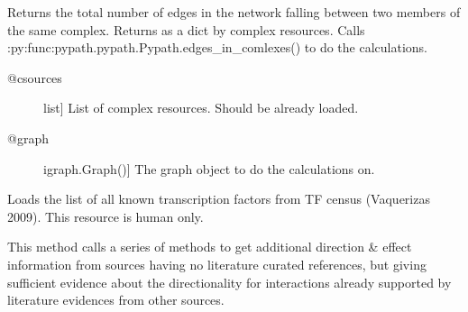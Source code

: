 \documentclass[letterpaper,10pt,english]{sphinxmanual}
\begin{document}
\begin{fulllineitems}

\begin{fulllineitems}
\label{\detokenize{main:pypath.main.PyPath.sum_in_complex}}
Returns the total number of edges in the network falling
between two members of the same complex.
Returns as a dict by complex resources.
Calls :py:func:pypath.pypath.Pypath.edges\_in\_comlexes()
to do the calculations.
\begin{description}
\item[{@csources}] \leavevmode{[}list{]}
List of complex resources. Should be already loaded.

\item[{@graph}] \leavevmode{[}igraph.Graph(){]}
The graph object to do the calculations on.

\end{description}

\end{fulllineitems}


\begin{fulllineitems}
\label{\detokenize{main:pypath.main.PyPath.table_latex}}
\end{fulllineitems}


\begin{fulllineitems}
\label{\detokenize{main:pypath.main.PyPath.tfs_list}}
Loads the list of all known transcription factors from TF census
(Vaquerizas 2009). This resource is human only.

\end{fulllineitems}


\begin{fulllineitems}
\label{\detokenize{main:pypath.main.PyPath.third_source_directions}}
This method calls a series of methods to get
additional direction \& effect information
from sources having no literature curated references,
but giving sufficient evidence about the directionality
for interactions already supported by literature
evidences from other sources.


\end{fulllineitems}
\end{fulllineitems}
\end{document}

